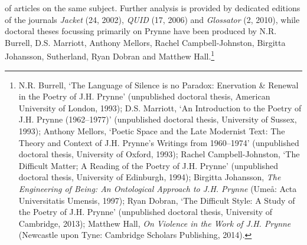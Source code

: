 \documentclass[]{article}
\begin{document}
of articles on the same subject. Further analysis is provided by
dedicated editions of the journals \emph{Jacket} (24, 2002), \emph{QUID}
(17, 2006) and \emph{Glossator} (2, 2010), while doctoral theses
focussing primarily on Prynne have been produced by N.R. Burrell, D.S.
Marriott, Anthony Mellors, Rachel Campbell-Johnston, Birgitta Johansson,
Sutherland, Ryan Dobran and Matthew Hall.\footnote{N.R. Burrell, ‘The
  Language of Silence is no Paradox: Enervation \& Renewal in the Poetry
  of J.H. Prynne’ (unpublished doctoral thesis, American University of
  London, 1993); D.S. Marriott, ‘An Introduction to the Poetry of J.H.
  Prynne (1962–1977)’ (unpublished doctoral thesis, University of
  Sussex, 1993); Anthony Mellors, ‘Poetic Space and the Late Modernist
  Text: The Theory and Context of J.H. Prynne’s Writings from 1960–1974’
  (unpublished doctoral thesis, University of Oxford, 1993); Rachel
  Campbell-Johnston, ‘The Difficult Matter; A Reading of the Poetry of
  J.H. Prynne’ (unpublished doctoral thesis, University of Edinburgh,
  1994); Birgitta Johansson, \emph{The Engineering of Being: An
  Ontological Approach to J.H. Prynne} (Umeå: Acta Universitatis
  Umensis, 1997); Ryan Dobran, ‘The Difficult Style: A Study of the
  Poetry of J.H. Prynne’ (unpublished doctoral thesis, University of
  Cambridge, 2013); Matthew Hall, \emph{On Violence in the Work of J.H.
  Prynne} (Newcastle upon Tyne: Cambridge Scholars Publishing, 2014).}
\end{document}
